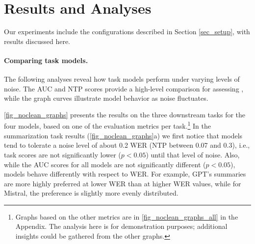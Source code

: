 \section{Results and Analyses}
\label{sec_results}



%

Our experiments include the configurations described in Section \ref{sec_setup}, with results discussed here.

\paragraph{Comparing task models.}
The following analyses reveal how task models perform under varying levels of noise. The AUC and NTP scores provide a high-level comparison for assessing \ENDow{}, while the graph curves illustrate model behavior as noise fluctuates.

\autoref{fig_noclean_graphs}
presents the results on the three downstream tasks for the four models, based on one of the evaluation metrics per task.\footnote{Graphs based on the other metrics are in \autoref{fig_noclean_graphs_all} in the Appendix. The analysis here is for demonstration purposes; additional insights could be gathered from the other graphs.} 
In the summarization task results (\autoref{fig_noclean_graphs}a) we first notice that models tend to tolerate a noise level of about 0.2 WER (NTP between 0.07 and 0.3), i.e., task scores are not significantly lower ($p<0.05$) until that level of noise. Also, while the AUC scores for all models are not significantly different ($p<0.05$), models behave differently with respect to WER. For example, GPT's summaries are more highly preferred at lower WER than at higher WER values, while for Mistral, the preference is slightly more evenly distributed.

